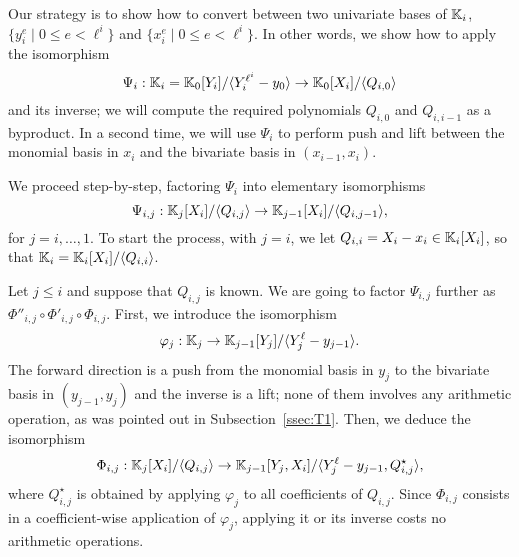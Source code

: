 \documentclass{sig-alternate}
\begin{document}
Our strategy is to show how to convert between two univariate bases of
$\mathbb{K}_i$, $\{y_i^e \mid 0 \le e < \ell^i\}$ and $\{x_i^e \mid 0 \le e <
\ell^i\}$. In other words, we show how to apply the isomorphism
$$\Psi_i: \mathbb{K}_i=\mathbb{K}_0[Y_i]/\langle Y_i^{\ell^i}-y_0\rangle \to
\mathbb{K}_0[X_i]/\langle Q_{i,0}\rangle$$ and its inverse; we will compute
the required polynomials $Q_{i,0}$ and $Q_{i,i-1}$ as a byproduct. In
a second time, we will use $\Psi_i$ to perform push and lift between
the monomial basis in $x_i$ and the bivariate basis in
$(x_{i-1},x_i)$.

We proceed step-by-step, factoring $\Psi_i$ into elementary
isomorphisms
$$\Psi_{i,j}: \mathbb{K}_j[X_i]/\langle Q_{i,j}\rangle \to
\mathbb{K}_{j-1}[X_i]/\langle Q_{i,j-1}\rangle,$$ for $j=i,\dots,1$.  To start
the process, with $j=i$, we let $Q_{i,i}=X_i-x_i \in \mathbb{K}_i[X_i]$,
so that $\mathbb{K}_i=\mathbb{K}_i[X_i]/\langle Q_{i,i} \rangle$.

Let $j \le i$ and suppose that $Q_{i,j}$ is known. We are going to
factor $\Psi_{i,j}$ further as $\Phi''_{i,j} \circ \Phi'_{i,j} \circ
\Phi_{i,j}$. First, we introduce the isomorphism
$$\varphi_j: \mathbb{K}_j \to \mathbb{K}_{j-1}[Y_j]/\langle Y_j^\ell-y_{j-1}\rangle.$$
The forward direction is a push from the monomial basis in $y_j$ to
the bivariate basis in $(y_{j-1},y_j)$ and the inverse is a lift; none
of them involves any arithmetic operation, as was pointed out in
Subsection~\ref{ssec:T1}.  Then, we deduce the isomorphism
$$\Phi_{i,j}: \mathbb{K}_j[X_i]/\langle Q_{i,j} \rangle \to
\mathbb{K}_{j-1}[Y_j,X_i]/\langle Y_j^\ell-y_{j-1}, Q^\star_{i,j}\rangle,$$
where $Q^\star_{i,j}$ is obtained by applying $\varphi_j$ to all
coefficients of $Q_{i,j}$. Since $\Phi_{i,j}$ consists in a
coefficient-wise application of $\varphi_j$, applying it or its
inverse costs no arithmetic operations.
\end{document}
